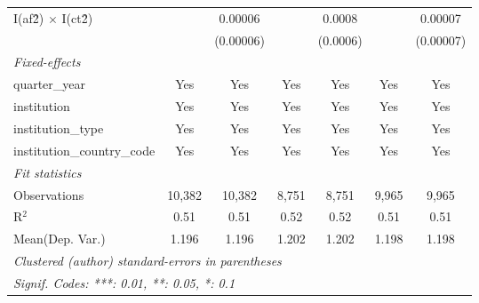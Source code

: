 \begin{tabular}{lcccccc}
   I(af\^2) $\times$ I(ct\^2)         &               & 0.00006        &               & 0.0008         &               & 0.00007\\   
                                      &               & (0.00006)      &               & (0.0006)       &               & (0.00007)\\   
   \midrule
   \emph{Fixed-effects}\\
   quarter\_year                      & Yes           & Yes            & Yes           & Yes            & Yes           & Yes\\  
   institution                        & Yes           & Yes            & Yes           & Yes            & Yes           & Yes\\  
   institution\_type                  & Yes           & Yes            & Yes           & Yes            & Yes           & Yes\\  
   institution\_country\_code         & Yes           & Yes            & Yes           & Yes            & Yes           & Yes\\  
   \midrule
   \emph{Fit statistics}\\
   Observations                       & 10,382        & 10,382         & 8,751         & 8,751          & 9,965         & 9,965\\  
   R$^2$                              & 0.51          & 0.51           & 0.52          & 0.52           & 0.51          & 0.51\\  
Mean(Dep. Var.) & 1.196 & 1.196 & 1.202 & 1.202 & 1.198 & 1.198 \\
   \midrule \midrule
   \multicolumn{7}{l}{\emph{Clustered (author) standard-errors in parentheses}}\\
   \multicolumn{7}{l}{\emph{Signif. Codes: ***: 0.01, **: 0.05, *: 0.1}}\\
\end{tabular}
\par\endgroup
